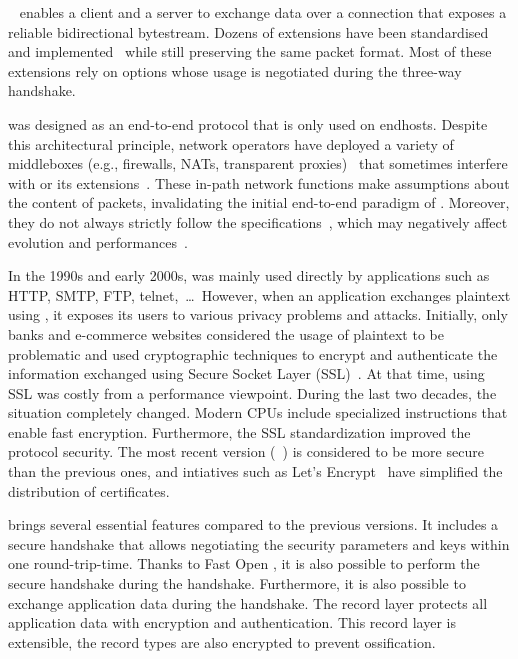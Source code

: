 
\tcp~\cite{rfc793} enables a client and a server to exchange data
over a connection that exposes a reliable bidirectional bytestream.
Dozens of \tcp extensions have been standardised and implemented~\cite{RFC7414}
while still preserving the same packet format. Most of these extensions rely on
\tcp options whose usage is negotiated during the three-way handshake.

\tcp was designed as an end-to-end protocol that is only used on endhosts.
Despite this architectural principle, network operators have deployed a variety
of middleboxes (e.g., firewalls, NATs, transparent proxies)~\cite{mCloud} that
sometimes interfere with \tcp or its extensions~\cite{medina2004measuring,
honda2011still, edeline2019bottom}. These in-path network functions make
assumptions about the content of \tcp packets, invalidating the initial
end-to-end paradigm of \tcp. Moreover, they do not always strictly follow the
\tcp specifications~\cite{honda2011still, hesmans2013tcp}, which may negatively
affect \tcp evolution and performances~\cite{edeline2020evaluating}.


In the 1990s and early 2000s, \tcp was mainly used directly by applications such
as HTTP, SMTP, FTP, telnet,~\ldots~However, when an application exchanges
plaintext using \tcp, it exposes its users to various privacy problems and
attacks. Initially, only banks and e-commerce websites considered the usage of
plaintext to be problematic and used cryptographic techniques to encrypt and
authenticate the information exchanged using Secure Socket Layer
(SSL)~\cite{draft-hickman-netscape-ssl}. At that time, using SSL was costly from
a performance viewpoint. During the last two decades, the situation completely
changed. Modern CPUs include specialized instructions that enable fast
encryption. Furthermore, the SSL standardization improved the protocol security.
The most recent version (~\cite{rfc8446}) is considered to be more
secure than the previous ones, and intiatives such as Let's Encrypt~\cite{aas2019let} have simplified the distribution of certificates.

 brings several essential features compared to the previous versions. It
includes a secure handshake that allows negotiating the security parameters and
keys within one round-trip-time. Thanks to \tcp Fast Open
\cite{radhakrishnan2011tcp}, it is also possible to perform the secure handshake
during the \tcp handshake. Furthermore, it is also possible to exchange
application data during the handshake. The  record layer protects all
application data with encryption and authentication. This record layer is
extensible, the \tls record types are also
encrypted to prevent ossification.

